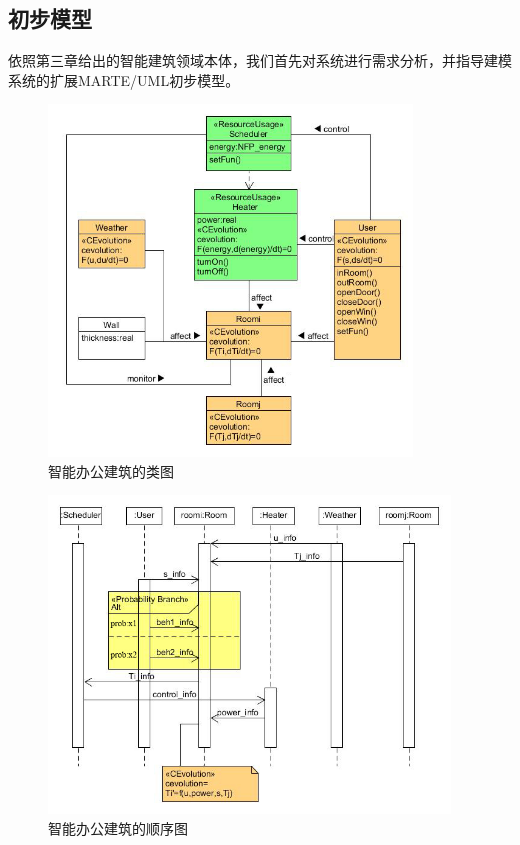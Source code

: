 \subsection{初步模型}	
	依照第三章给出的智能建筑领域本体，我们首先对系统进行需求分析，并指导建模系统的扩展MARTE/UML初步模型。	
	\begin{figure}[!t]
	\centering
	\includegraphics[width=3.8in]{sb-cd.jpg}
	\caption{智能办公建筑的类图}
	\label{sb-cd}
	\end{figure}
	
	\begin{figure}[!t]
	\centering
	\includegraphics[width=4.2in]{sb-sd.jpg}
	\caption{智能办公建筑的顺序图}
	\label{sb-sd}
	\end{figure}
	
